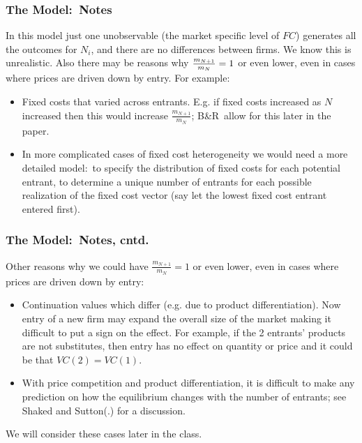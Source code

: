 \documentclass[notes=show]{beamer}
\begin{document}
\begin{frame}%

\frametitle{The Model:\ Notes}

In this model just one unobservable (the market specific level of $FC$)
generates all the outcomes for $N_{i}$, and there are no differences between
firms. We know this is unrealistic. Also there may be reasons why $\frac{%
m_{N+1}}{m_{N}}=1$ or even lower, even in cases where prices are driven down
by entry. For example:\ 

\begin{itemize}
\item Fixed costs that varied across entrants. E.g. if fixed costs increased
as $N$ increased then this would increase $\frac{m_{N+1}}{m_{N}}$; B\&R\
allow for this later in the paper.

\item In more complicated cases of fixed cost heterogeneity we would need a
more detailed model:\ to specify the distribution of fixed costs for each
potential entrant, to determine a unique number of entrants for each
possible realization of the fixed cost vector (say let the lowest fixed cost
entrant entered first).
\end{itemize}

\end{frame}%

\begin{frame}%

\frametitle{The Model:\ Notes, cntd.}

Other reasons why we could have $\frac{m_{N+1}}{m_{N}}=1$ or even lower,
even in cases where prices are driven down by entry:

\begin{itemize}
\item Continuation values which differ (e.g. due to product
differentiation). Now entry of a new firm may expand the overall size of the
market making it difficult to put a sign on the effect. For example, if the
2 entrants' products are not substitutes, then entry has no effect on
quantity or price and it could be that $VC(2)=VC(1)$.

\item With price competition and product differentiation, it is difficult to
make any prediction on how the equilibrium changes with the number of
entrants; see Shaked and Sutton(.) for a discussion.
\end{itemize}

We will consider these cases later in the class.

\end{frame}%
\end{document}
